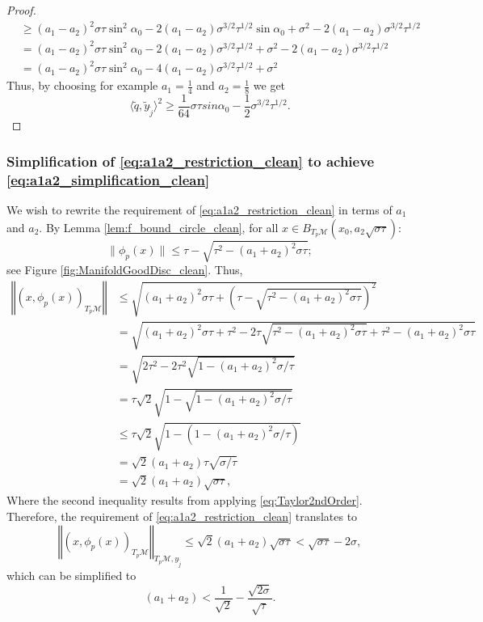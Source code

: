 \documentclass[12pt]{article}
\theoremstyle{remark}
\newcommand{\MM}{\mathcal{M}}
\newcommand{\norm}[1]{\left\Vert #1 \right\Vert}
\newcommand{\lrangle}[1]{\langle #1 \rangle}
\begin{document}
\begin{appendices}
\begin{proof}
\begin{align*}
    &\geq (a_1-a_2)^2{\sigma\tau}\sin^2 \alpha_0 - 2(a_1-a_2)\sigma^{3/2}\tau^{1/2}\sin\alpha_0 + \sigma^2 -2(a_1-a_2)\sigma^{3/2}{\tau}^{1/2} \\
    &= (a_1-a_2)^2{\sigma\tau}\sin^2 \alpha_0 - 2(a_1-a_2)\sigma^{3/2}\tau^{1/2} + \sigma^2 -2(a_1-a_2)\sigma^{3/2}{\tau}^{1/2} \\
    &= (a_1-a_2)^2{\sigma\tau}\sin^2 \alpha_0 - 4(a_1-a_2)\sigma^{3/2}\tau^{1/2} + \sigma^2 
\end{align*}
Thus, by choosing for example $a_1 = \frac{1}{4}$ and $a_2 = \frac{1}{8}$ we get
\begin{equation}
    \lrangle{\tilde q, \tilde y_{\tilde j}}^2 \geq \frac{1}{64}\sigma \tau sin\alpha_0 - \frac{1}{2}\sigma^{3/2}\tau^{1/2}
.\end{equation}
\end{proof}
\subsubsection{Simplification of \eqref{eq:a1a2_restriction_clean} to achieve \eqref{eq:a1a2_simplification_clean}}\label{subsec:simplification_app}
We wish to rewrite the requirement of \eqref{eq:a1a2_restriction_clean} in terms of $a_1$ and $a_2$.
By Lemma \ref{lem:f_bound_circle_clean}, for all $x\in B_{T_p\MM}(x_0, a_2 \sqrt{\sigma\tau})$:
\begin{equation*}
    \|\phi_p(x)\| \leq \tau - \sqrt{\tau^2 - (a_1+a_2)^2 {\sigma\tau}} 
;\end{equation*}
see Figure \ref{fig:ManifoldGoodDisc_clean}.
Thus,
\begin{align*}
\norm{(x,\phi_p(x))_{T_p\MM}}
& \leq \sqrt{(a_1+a_2)^2 {\sigma\tau} + \left(\tau - \sqrt{\tau^2 - (a_1+a_2)^2 {\sigma\tau}}\right)^2} \\
&= \sqrt{(a_1+a_2)^2{\sigma\tau} + \tau^2 - 2\tau\sqrt{\tau^2 - (a_1+a_2)^2 {\sigma\tau}} + \tau^2 - (a_1+a_2)^2 {\sigma\tau}} \\
&= \sqrt{2\tau^2 - 2\tau^2\sqrt{1 - (a_1+a_2)^2 {\sigma/\tau}} } \\
&= \tau\sqrt{2} \sqrt{1 - \sqrt{1 - (a_1+a_2)^2 {\sigma/\tau}} } \\
&\leq \tau\sqrt{2} \sqrt{1 - (1 - (a_1+a_2)^2 {\sigma/\tau}) } \\
&= \sqrt{2}(a_1+a_2) \tau\sqrt{ {\sigma/\tau} } \\
&= \sqrt{2}(a_1+a_2) \sqrt{ {\sigma\tau} },\end{align*}
Where the second inequality results from applying \eqref{eq:Taylor2ndOrder}.
Therefore, the requirement of \eqref{eq:a1a2_restriction_clean} translates to
$$
\norm{(x,\phi_p(x))_{T_p\MM}}_{T_p\MM,y_{\tilde j}}\leq \sqrt{2}(a_1+a_2)\sqrt{\sigma\tau}<\sqrt{\sigma\tau}-2\sigma
,$$
which can be simplified to 
$$
(a_1+a_2)<\frac{1}{\sqrt{2}} - \frac{\sqrt{2\sigma}}{\sqrt{\tau}} 
.$$



\end{appendices}
\end{document}
